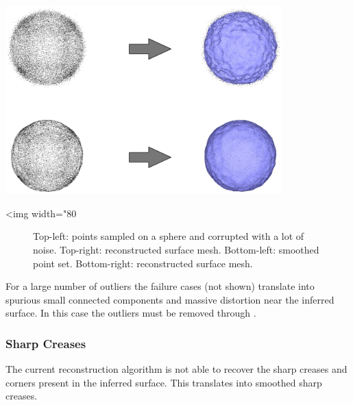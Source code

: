 \begin{center}
    \label{Surface_reconstruction_points_3-fig-noise}
    \begin{ccTexOnly}
\includegraphics[width=0.8\textwidth]{Surface_reconstruction_points_3/noise}
    \end{ccTexOnly}
    \begin{ccHtmlOnly}
        <img width="80%
    \end{ccHtmlOnly}
    \begin{figure}[h]
        \caption{Top-left: points sampled on a sphere and corrupted with a
                 lot of noise.
                 Top-right: reconstructed surface mesh.
                 Bottom-left: smoothed point set.
                 Bottom-right: reconstructed surface mesh.}
    \end{figure}
\end{center}

For a large number of outliers the failure cases (not shown) translate into spurious small connected components and massive distortion near the inferred surface. In this case the outliers must be removed through .


\subsubsection{Sharp Creases}

The current reconstruction algorithm is not able to recover the sharp creases and corners present in the inferred surface. This translates into smoothed sharp creases.

